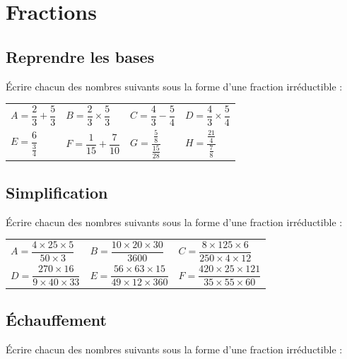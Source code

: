 \documentclass[oneside,12pt]{article}          %
\begin{document}
\section{Fractions}

\subsection{Reprendre les bases}
Écrire chacun des nombres suivants sous la forme d'une fraction irréductible :

\renewcommand{\arraystretch}{2.5}
\begin{tabular}{p{} p{} p{} p{}}
	$A = \dfrac{2}{3} + \dfrac{5}{3}$ &
	$B = \dfrac{2}{3} \times \dfrac{5}{3}$ &
	$C = \dfrac{4}{3} - \dfrac{5}{4}$ &
	$D = \dfrac{4}{3} \times \dfrac{5}{4}$ \\
	$E = \dfrac{6}{\frac{3}{4}}$ &
	$F = \dfrac{1}{15} + \dfrac{7}{10}$ &
	$G = \dfrac{\frac{5}{8}}{\frac{15}{28}}$ &
	$H = \dfrac{\frac{21}{4}}{\frac{7}{8}}$

\end{tabular}



\subsection{Simplification}
Écrire chacun des nombres suivants sous la forme d'une fraction irréductible :

\renewcommand{\arraystretch}{2.5}
\begin{tabular}{p{} p{} p{} }
	$A = \dfrac{4 \times 25 \times 5}{50 \times 3}$ &
	$B = \dfrac{10 \times 20 \times 30}{3600}$ & 
	$C = \dfrac{8 \times 125 \times 6}{250 \times 4 \times 12}$ \\
	$D = \dfrac{270 \times 16}{9 \times 40 \times 33}$ &
	$E = \dfrac{56 \times 63 \times 15}{49 \times 12 \times 360}$ &
	$F = \dfrac{420 \times 25 \times 121}{35 \times 55 \times 60}$  
\end{tabular}



\subsection{Échauffement}
Écrire chacun des nombres suivants sous la forme d'une fraction irréductible :
\end{document}
